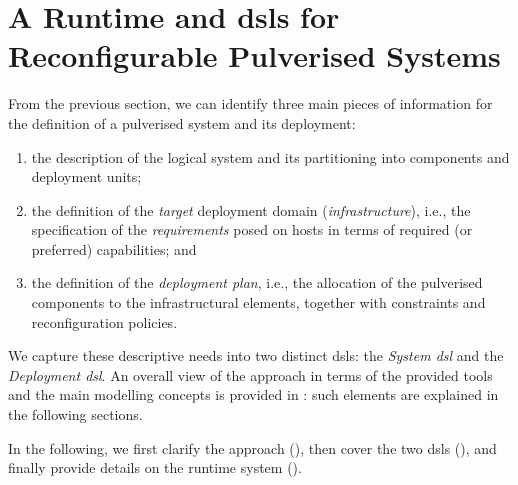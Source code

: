 \documentclass[conference]{IEEEtran}
\begin{document}
\newcommand{\dslSys}[0]{\emph{System \ac{dsl}}}
\newcommand{\dslDep}[0]{\emph{Deployment \ac{dsl}}}

\section{A Runtime and \acsp{dsl} for Reconfigurable Pulverised Systems}\label{sec:contribution}

From the previous section,
we can identify three main pieces of information for the definition of a pulverised system and its deployment:
\begin{enumerate}[label=\it{(\roman*)}]
  \item the description of the logical system and its partitioning into components and deployment units;
  \item the definition of the \emph{target} deployment domain (\emph{infrastructure}), i.e., the specification of the \emph{requirements} posed on hosts in terms of required (or preferred) capabilities; and
  \item the definition of the \emph{deployment plan}, i.e., the allocation of the pulverised components to the infrastructural elements, together with constraints and reconfiguration policies.
\end{enumerate}
%
We capture these %
 descriptive needs into two distinct \acp{dsl}: the \dslSys{} and the \dslDep{}.
%
An overall view of the approach in terms of the provided tools and the main modelling concepts is provided in : such elements are explained in the following sections.

In the following,
 we first clarify the approach (),
 then cover the two \acp{dsl}
 (),
 and finally provide details on the runtime system ().
\end{document}
